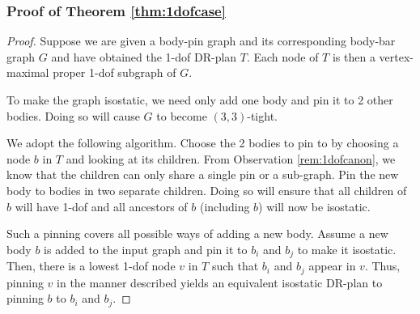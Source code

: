 \subsubsection{Proof of Theorem \ref{thm:1dofcase}}
\begin{proof}
    Suppose we are given a body-pin graph and its corresponding body-bar graph $G$ and have obtained the 1-dof DR-plan $T$. Each node of $T$ is then a vertex-maximal proper 1-dof subgraph of $G$.

    To make the graph isostatic, we need only add one body and pin it to 2 other bodies. Doing so will cause $G$ to become $(3,3)$-tight.

We adopt the following algorithm. Choose the 2 bodies to pin to by choosing a node $b$ in $T$ and looking at its children. From Observation \ref{rem:1dofcanon}, we know that the children can only share  a single pin or a sub-graph. Pin the new body to bodies in two separate children. Doing so will ensure that all children of $b$ will have 1-dof and all ancestors of $b$ (including $b$) will now be isostatic.


    Such a pinning covers all possible ways of adding a new body. Assume a new body $b$ is added to the input  graph and pin it to $b_i$ and $b_j$ to make it isostatic. Then, there is a lowest 1-dof node $v$ in $T$ such that $b_i$ and $b_j$ appear in $v$. Thus, pinning $v$ in the manner described yields an equivalent isostatic DR-plan to pinning $b$ to $b_i$ and $b_j$.


\end{proof}
